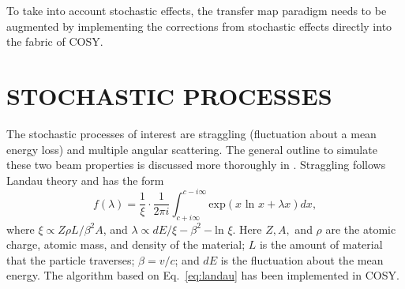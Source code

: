\documentclass{jacow}
\begin{document}

To take into account stochastic effects, the transfer map paradigm needs to be augmented by implementing the corrections from stochastic effects directly into the fabric of COSY. %

\section{STOCHASTIC PROCESSES}
The stochastic processes of interest are straggling (fluctuation about a mean energy loss) and multiple angular scattering. The general outline to simulate these two beam properties is discussed more thoroughly in \cite{icap15}. Straggling follows Landau theory and has the form \cite{landau}
\begin{equation}
f(\lambda) = \frac{1}{\xi} \cdot \frac{1}{2\pi i} \int_{c+i \infty} ^{c-i \infty} \text{exp}(x\text{ ln } x + \lambda x) dx,
\label{eq:landau}
\end{equation}
where $\xi \propto Z\rho L/\beta^2 A$, and $\lambda \propto dE/\xi - \beta^2 - \text{ln } \xi$. Here $Z, A,$ and $\rho$ are the atomic charge, atomic mass, and density of the material; $L$ is the amount of material that the particle traverses; $\beta=v/c$; and $dE$ is the fluctuation about the mean energy. The algorithm based on Eq.~\eqref{eq:landau} has been implemented in COSY.
\end{document}
